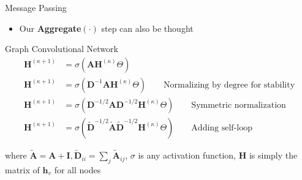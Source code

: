 \documentclass{beamer}
\newcommand{\node}{v}
\newcommand{\nrepresent}{h}
\newcommand{\NodeRepMat}{\mathbf{H}}
\newcommand{\DegMat}{\mathbf{D}}
\newcommand{\iter}{\kappa}
\newcommand{\AdjMat}{\mathbf{A}}
\newcommand{\Identity}{\mathbf{I}}
\begin{document}
\begin{frame}{Message Passing}
    \begin{itemize}
        \item Our {\bf Aggregate$(\cdot)$} step can also be thought 
    \end{itemize}
\end{frame}

\begin{frame}{Graph Convolutional Network}
\begin{align*}
    \NodeRepMat^{(\iter+1)}
    &=
    \sigma
    \left( 
        \AdjMat \NodeRepMat^{(\iter)} \Theta
    \right) 
\\
    \NodeRepMat^{(\iter+1)}
    &=
    \sigma
    \left( 
        \DegMat^{-1}\AdjMat \NodeRepMat^{(\iter)} \Theta
    \right) 
    \qquad{\text{Normalizing by degree for stability}}
\\
    \NodeRepMat^{(\iter+1)}
    &=
    \sigma
    \left( 
        \DegMat^{-1/2}\AdjMat\DegMat^{-1/2} \NodeRepMat^{(\iter)} \Theta
    \right) 
    \qquad{\text{Symmetric normalization}} %
\\
    \NodeRepMat^{(\iter+1)}
    &=
    \sigma
    \left( 
        \widetilde{\DegMat}^{-1/2}
        \widetilde{\AdjMat}
        \widetilde{\DegMat}^{-1/2} \NodeRepMat^{(\iter)} \Theta
    \right) 
    \qquad{\text{Adding self-loop}}
\end{align*}

where $\widetilde{\AdjMat} = \AdjMat + \Identity, \widetilde{\DegMat}_{ii} = \sum_j \widetilde{\AdjMat}_{ij}$, $\sigma$ is any activation function, $\NodeRepMat$ is simply the matrix of $\mathbf{\nrepresent}_\node$ for all nodes 
\end{frame}
\end{document}
